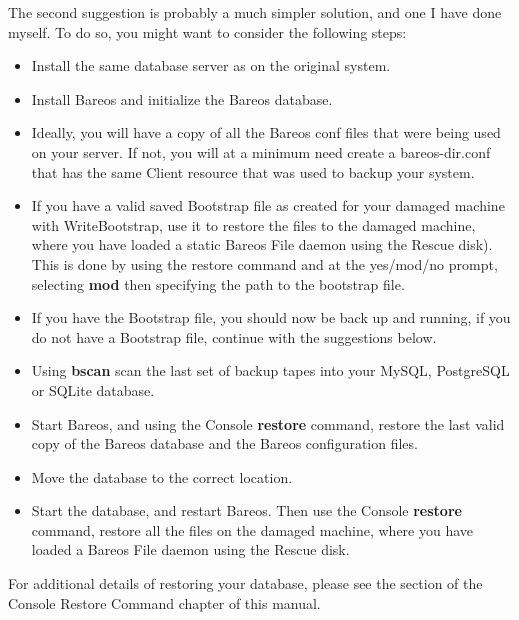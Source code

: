 The second suggestion is probably a much simpler solution, and one I have done
myself. To do so, you might want to consider the following steps:

\begin{itemize}
\item Install the same database server as on the original system.
\item Install Bareos and initialize the Bareos database.
\item Ideally, you will have a copy of all the Bareos conf files that
   were being used on your server. If not, you will at a minimum need
   create a bareos-dir.conf that has the same Client resource that
   was used to backup your system.
\item If you have a valid saved Bootstrap file as created for your damaged
   machine with WriteBootstrap, use it to restore the files to the damaged
   machine, where you have loaded a static Bareos File daemon using the
   Rescue disk).  This is done by using the restore command and at
   the yes/mod/no prompt, selecting {\bf mod} then specifying the path to
   the bootstrap file.
\item If you have the Bootstrap file, you should now be back up and  running,
   if you do not have a Bootstrap file, continue with the  suggestions below.
\item Using {\bf bscan} scan the last set of backup tapes into your  MySQL,
   PostgreSQL or SQLite database.
\item Start Bareos, and using the Console {\bf restore} command,  restore the
   last valid copy of the Bareos database and the Bareos configuration
   files.
\item Move the database to the correct location.
\item Start the database, and restart Bareos. Then use the Console {\bf
   restore} command, restore all the files  on the damaged machine, where you
   have loaded a Bareos File  daemon using the Rescue disk.
\end{itemize}

For additional details of restoring your database, please see the
 section
of the Console Restore Command chapter of this manual.


